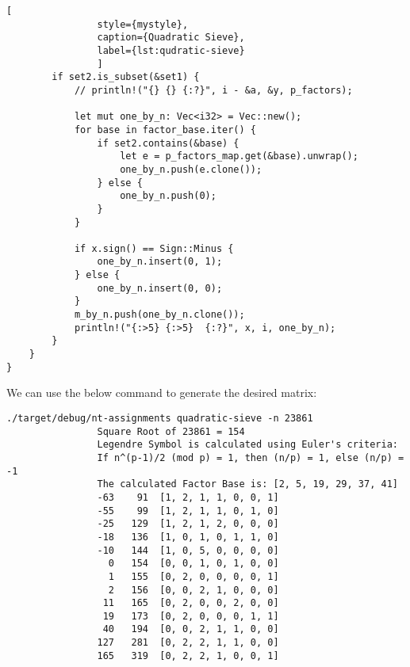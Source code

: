 \documentclass[11pt,a4paper,fleqn]{article}
\begin{document}
\begin{enumerate}[1.]
\begin{flushleft}
\begin{enumerate}[Step 1.]
\begin{lstlisting}[
                style={mystyle},
                caption={Quadratic Sieve},
                label={lst:qudratic-sieve}
                ]
        if set2.is_subset(&set1) {
            // println!("{} {} {:?}", i - &a, &y, p_factors);

            let mut one_by_n: Vec<i32> = Vec::new();
            for base in factor_base.iter() {
                if set2.contains(&base) {
                    let e = p_factors_map.get(&base).unwrap();
                    one_by_n.push(e.clone());
                } else {
                    one_by_n.push(0);
                }
            }

            if x.sign() == Sign::Minus {
                one_by_n.insert(0, 1);
            } else {
                one_by_n.insert(0, 0);
            }
            m_by_n.push(one_by_n.clone());
            println!("{:>5} {:>5}  {:?}", x, i, one_by_n);
        }
    }
}
                \end{lstlisting}

                \bigbreak
                We can use the below command to generate the desired matrix:
                \begin{lstlisting}[style=DOS, caption=Quadratic Sieve Matrix Generation]
                ./target/debug/nt-assignments quadratic-sieve -n 23861
                Square Root of 23861 = 154
                Legendre Symbol is calculated using Euler's criteria:
                If n^(p-1)/2 (mod p) = 1, then (n/p) = 1, else (n/p) = -1
                The calculated Factor Base is: [2, 5, 19, 29, 37, 41]
                -63    91  [1, 2, 1, 1, 0, 0, 1]
                -55    99  [1, 2, 1, 1, 0, 1, 0]
                -25   129  [1, 2, 1, 2, 0, 0, 0]
                -18   136  [1, 0, 1, 0, 1, 1, 0]
                -10   144  [1, 0, 5, 0, 0, 0, 0]
                  0   154  [0, 0, 1, 0, 1, 0, 0]
                  1   155  [0, 2, 0, 0, 0, 0, 1]
                  2   156  [0, 0, 2, 1, 0, 0, 0]
                 11   165  [0, 2, 0, 0, 2, 0, 0]
                 19   173  [0, 2, 0, 0, 0, 1, 1]
                 40   194  [0, 0, 2, 1, 1, 0, 0]
                127   281  [0, 2, 2, 1, 1, 0, 0]
                165   319  [0, 2, 2, 1, 0, 0, 1]
                \end{lstlisting}
            \end{enumerate}
		\end{flushleft}


\end{enumerate}
\end{document}
